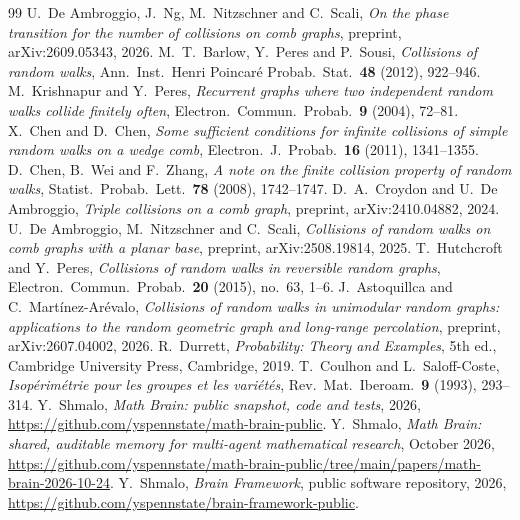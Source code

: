 \documentclass[11pt]{amsart}
\theoremstyle{remark}
\numberwithin{equation}{section}
\begin{document}
\begin{thebibliography}{99}
 U.~De Ambroggio, J.~Ng, M.~Nitzschner and C.~Scali, \emph{On the phase transition for the number of collisions on comb graphs}, preprint, arXiv:2609.05343, 2026.
 M.~T.~Barlow, Y.~Peres and P.~Sousi, \emph{Collisions of random walks}, Ann.\ Inst.\ Henri Poincar\'e Probab.\ Stat.\ \textbf{48} (2012), 922--946.
 M.~Krishnapur and Y.~Peres, \emph{Recurrent graphs where two independent random walks collide finitely often}, Electron.\ Commun.\ Probab.\ \textbf{9} (2004), 72--81.
 X.~Chen and D.~Chen, \emph{Some sufficient conditions for infinite collisions of simple random walks on a wedge comb}, Electron.\ J.\ Probab.\ \textbf{16} (2011), 1341--1355.
 D.~Chen, B.~Wei and F.~Zhang, \emph{A note on the finite collision property of random walks}, Statist.\ Probab.\ Lett.\ \textbf{78} (2008), 1742--1747.
 D.~A.~Croydon and U.~De Ambroggio, \emph{Triple collisions on a comb graph}, preprint, arXiv:2410.04882, 2024.
 U.~De Ambroggio, M.~Nitzschner and C.~Scali, \emph{Collisions of random walks on comb graphs with a planar base}, preprint, arXiv:2508.19814, 2025.
 T.~Hutchcroft and Y.~Peres, \emph{Collisions of random walks in reversible random graphs}, Electron.\ Commun.\ Probab.\ \textbf{20} (2015), no.~63, 1--6.
 J.~Astoquillca and C.~Mart\'inez-Ar\'evalo, \emph{Collisions of random walks in unimodular random graphs: applications to the random geometric graph and long-range percolation}, preprint, arXiv:2607.04002, 2026.
 R.~Durrett, \emph{Probability: Theory and Examples}, 5th ed., Cambridge University Press, Cambridge, 2019.
 T.~Coulhon and L.~Saloff-Coste, \emph{Isop\'erim\'etrie pour les groupes et les vari\'et\'es}, Rev.\ Mat.\ Iberoam.\ \textbf{9} (1993), 293--314.
 Y.~Shmalo, \emph{Math Brain: public snapshot, code and tests}, 2026, \url{https://github.com/yspennstate/math-brain-public}.
 Y.~Shmalo, \emph{Math Brain: shared, auditable memory for multi-agent mathematical research}, October 2026, \url{https://github.com/yspennstate/math-brain-public/tree/main/papers/math-brain-2026-10-24}.
 Y.~Shmalo, \emph{Brain Framework}, public software repository, 2026, \url{https://github.com/yspennstate/brain-framework-public}.
\end{thebibliography}
\end{document}

